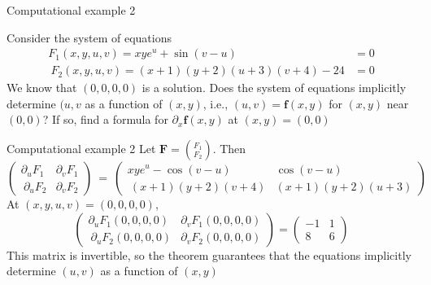 \begin{frame}{Computational example 2}
    \begin{parchment}[Problem 02]
        Consider the system of equations
        \begin{align}
            F_1(x,y,u,v) = xye^u +  \sin(v-u) &= 0\\\
            F_2(x,y,u,v)  =(x+1)(y+2)(u+3)(v+4) - 24 &=0
        \end{align}
        We know that $(0, 0, 0, 0)$ is a solution. Does the system of equations implicitly determine $(u, v$ as a function of $(x, y)$, i.e., $(u,v) = \mathbf{f}(x, y)$ for $(x, y)$ near $(0, 0)$? If so, find a formula for $\partial_x \mathbf{f}(x, y)$ at $(x, y) = (0, 0)$ 
    \end{parchment}
\end{frame}

\begin{frame}{Computational example 2}
    Let $\mathbf F = \binom{F_1}{F_2}$. Then
    \begin{equation}
        \left(\begin{array}{ll}
        \partial_u F_1&\partial_v F_1\\\
        \partial_u F_2&\partial_v F_2
        \end{array}
        \right)  \ = \ 
        \left(\begin{array}{cc}
        xye^u  - \cos(v-u)&\cos(v-u)\\\
        (x+1)(y+2)(v+4)&(x+1)(y+2)(u+3)
        \end{array}
        \right)
    \end{equation}
    At $(x,y,u,v) = (0,0,0,0)$,
    \begin{equation}
        \left(\begin{array}{ll}
        \partial_u F_1(0,0,0,0)&\partial_v F_1(0,0,0,0)\\\
        \partial_u F_2(0,0,0,0)&\partial_v F_2(0,0,0,0)
        \end{array}\right)
        = \left(\begin{array}{rr}
        -1&1\\ 8&6
        \end{array}
        \right)
    \end{equation}
    This matrix is invertible, so the theorem guarantees that the equations implicitly determine $(u, v)$ as a function of $(x, y)$
\end{frame}

